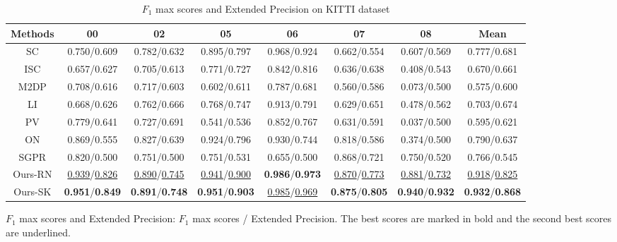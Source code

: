 \documentclass[letterpaper, 10 pt, conference]{ieeeconf}
\begin{document}
  \begin{table*}[htb]\footnotesize
    \caption{\centering \(F_1\) max scores and Extended Precision on KITTI dataset}\vspace{-3mm}
    \label{table:F1}
    \begin{center}
    \begin{threeparttable}
        {
    \begin{tabular}{c c c c c c c c}
    \hline
    Methods & 00 & 02 & 05 & 06 & 07 &08&Mean\\ 
    \hline
    SC\cite{SC} & 0.750/0.609 & 0.782/0.632 &0.895/0.797&0.968/0.924&0.662/0.554&0.607/0.569&0.777/0.681\\
    ISC\cite{ISC}&0.657/0.627&0.705/0.613&0.771/0.727&0.842/0.816&0.636/0.638&0.408/0.543&0.670/0.661\\
    M2DP\cite{M2DP}&0.708/0.616&0.717/0.603&0.602/0.611&0.787/0.681&0.560/0.586&0.073/0.500&0.575/0.600\\
    LI\cite{LI}&0.668/0.626&0.762/0.666&0.768/0.747&0.913/0.791&0.629/0.651&0.478/0.562&0.703/0.674\\
    PV\cite{PV}&0.779/0.641&0.727/0.691&0.541/0.536&0.852/0.767&0.631/0.591&0.037/0.500&0.595/0.621\\
    ON\cite{ON}&0.869/0.555&0.827/0.639&0.924/0.796&0.930/0.744&0.818/0.586&0.374/0.500&0.790/0.637\\
    SGPR\cite{SGPR}&0.820/0.500&0.751/0.500&0.751/0.531&0.655/0.500&0.868/0.721&0.750/0.520&0.766/0.545\\
    Ours-RN&\underline{0.939}/\underline{0.826}&\underline{0.890}/\underline{0.745}&\underline{0.941}/\underline{0.900}&\textbf{0.986}/\textbf{0.973}&\underline{0.870}/\underline{0.773}&\underline{0.881}/\underline{0.732}&\underline{0.918}/\underline{0.825}\\
    Ours-SK&\textbf{0.951}/\textbf{0.849}&\textbf{0.891}/\textbf{0.748}&\textbf{0.951}/\textbf{0.903}&\underline{0.985}/\underline{0.969}&\textbf{0.875}/\textbf{0.805}&\textbf{0.940}/\textbf{0.932}&\textbf{0.932}/\textbf{0.868}\\
    \hline
    \end{tabular}
    }
    \begin{tablenotes} 
\footnotesize
        \item \(F_1\) max scores and Extended Precision: \(F_1\) max scores / Extended Precision. The best scores are marked in bold and the second best scores are underlined.
\end{tablenotes}
    \end{threeparttable}
    \end{center}
    \end{table*}
\end{document}
